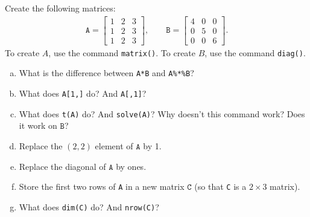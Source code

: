 \documentclass{beamer}
\begin{document}
\begin{frame}[allowframebreaks]
	\begin{myexc}[Matrices]
	\fontsize{9pt}{12}\selectfont
	Create the following matrices:
	\begin{align*}
		\texttt{A} = \begin{bmatrix}
		 	1 & 2 & 3 \\
		 	1 & 2 & 3 \\
		 	1 & 2 & 3 
			\end{bmatrix}, \qquad \texttt{B} = \begin{bmatrix}
			4 & 0 & 0 \\
			0 & 5 & 0 \\
			0 & 0 & 6 
		\end{bmatrix}.
	\end{align*}
	To create $A$, use the command \texttt{matrix()}. To create $B$, use the command \texttt{diag()}.
	\begin{enumerate}[(a)]
		\item
		What is the difference between \texttt{A*B} and \texttt{A\%*\%B}?
		\item
		What does \texttt{A[1,]} do? And \texttt{A[,1]}?
		\item
		What does \texttt{t(A)} do? And \texttt{solve(A)}? Why doesn't this command work? Does it work on $\texttt{B}$?
		\item
		Replace the $(2,2)$ element of $\texttt{A}$ by 1.
		\item
		Replace the diagonal of $\texttt{A}$ by ones.
		\item
		Store the first two rows of \texttt{A} in a new matrix $\texttt{C}$ (so that \texttt{C} is a $2\times 3$ matrix).
		\item
		What does \texttt{dim(C)} do? And \texttt{nrow(C)}?
	\end{enumerate}
	\addtocounter{exccounter}{1}
	\end{myexc}



%
%
%
	
\end{frame}
\end{document}
